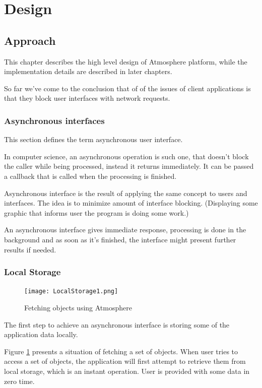 \section{Design}

\subsection{Approach}

This chapter describes the high level design of Atmosphere platform, while the implementation details are described in later chapters. 

So far we’ve come to the conclusion that of of the issues of client applications is that they block user interfaces with network requests.

\subsubsection{Asynchronous interfaces}

This section defines the term asynchronous user interface. \citep{maccaw_async}

In computer science, an asynchronous operation is such one, that doesn’t block the caller while being processed, instead it returns immediately. It can be passed a callback that is called when the processing is finished.

Asynchronous interface is the result of applying the same concept to users and interfaces. The idea is to minimize amount of interface blocking. (Displaying some graphic that informs user the program is doing some work.)

An asynchronous interface gives immediate response, processing is done in the background and as soon as it's finished, the interface might present further results if needed.

\subsubsection{Local Storage}

\begin{figure}[ht!]
\centering
\texttt{[image: LocalStorage1.png]}
\caption{Fetching objects using Atmosphere \label{fig:1}}
\end{figure}

The first step to achieve an asynchronous interface is storing some of the application data locally.

Figure \ref{fig:1} presents a situation of fetching a set of objects. When user tries to access a set of objects,  the application will first attempt to retrieve them from local storage,  which is an instant operation. User is provided with some data in zero time.

